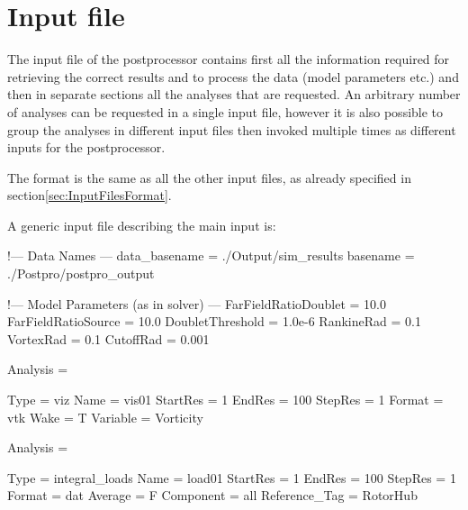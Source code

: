 \section{Input file}
\label{sec:Post_InputFile}

The input file of the postprocessor contains first all the information required for retrieving the correct results and to process the data (model parameters etc.) and then in separate sections all the analyses that are requested. An arbitrary number of analyses can be requested in a single input file, however it is also possible to group the analyses in different input files then invoked multiple times as different inputs for the postprocessor. 

The format is the same as all the other input files, as already specified in section\ref{sec:InputFilesFormat}.

A generic input file describing the main input is:

\begin{inputfile}[frame=single, caption={dust\_post.in}, label={file:dust_post.in}]
!--- Data Names ---
data_basename = ./Output/sim_results
basename =     ./Postpro/postpro_output

!--- Model Parameters (as in solver) ---
FarFieldRatioDoublet = 10.0
FarFieldRatioSource = 10.0
DoubletThreshold = 1.0e-6
RankineRad = 0.1
VortexRad = 0.1
CutoffRad = 0.001

Analysis = {

Type = viz  
Name = vis01
StartRes = 1
EndRes   = 100 
StepRes  = 1
Format = vtk
Wake = T
Variable = Vorticity 
}

Analysis = {

Type = integral_loads
Name = load01
StartRes = 1
EndRes   = 100 
StepRes  = 1
Format = dat
Average = F
Component = all
Reference_Tag = RotorHub
}

\end{inputfile}

